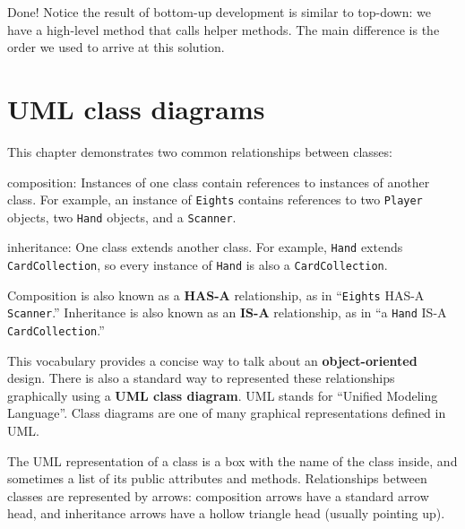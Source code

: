 \documentclass[12pt]{book}
\theoremstyle{exercise}
\newcommand{\java}[1]{\verb"#1"}
\begin{document}
Done!
Notice the result of bottom-up development is similar to top-down: we have a high-level method that calls helper methods.
The main difference is the order we used to arrive at this solution.


\section{UML class diagrams}


This chapter demonstrates two common relationships between classes:

\begin{description}

\item{composition:}
Instances of one class contain references to instances of another class.
For example, an instance of \java{Eights} contains references to two \java{Player} objects, two \java{Hand} objects, and a \java{Scanner}.

\item{inheritance:}
One class extends another class.
For example, \java{Hand} extends \java{CardCollection}, so every instance of \java{Hand} is also a \java{CardCollection}.

\end{description}


Composition is also known as a {\bf HAS-A} relationship, as in ``\java{Eights} HAS-A \java{Scanner}.''
Inheritance is also known as an {\bf IS-A} relationship, as in ``a \java{Hand} IS-A \java{CardCollection}.''

This vocabulary provides a concise way to talk about an {\bf object-oriented} design.
There is also a standard way to represented these relationships graphically using a {\bf UML class diagram}.
UML stands for ``Unified Modeling Language''.
Class diagrams are one of many graphical representations defined in UML.

The UML representation of a class is a box with the name of the class inside, and sometimes a list of its public attributes and methods.
Relationships between classes are represented by arrows: composition arrows have a standard arrow head, and inheritance arrows have a hollow triangle head (usually pointing up).
\end{document}
